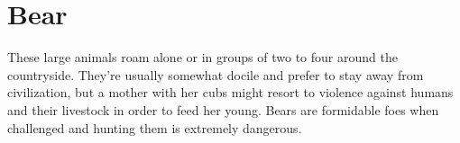 \section{Bear}

These large animals roam alone or in groups of two to four around the countryside. They're usually somewhat docile and prefer to stay away from civilization, but a mother with her cubs might resort to violence against humans and their livestock in order to feed her young. Bears are formidable foes when challenged and hunting them is extremely dangerous.